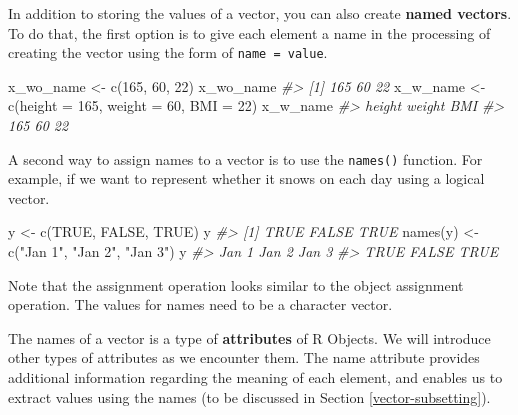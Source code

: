\documentclass[
]{book}
\newenvironment{Shaded}{\begin{snugshade}}{\end{snugshade}}
\newcommand{\AttributeTok}[1]{\textcolor[rgb]{0.77,0.63,0.00}{#1}}
\newcommand{\CommentTok}[1]{\textcolor[rgb]{0.56,0.35,0.01}{\textit{#1}}}
\newcommand{\ConstantTok}[1]{\textcolor[rgb]{0.00,0.00,0.00}{#1}}
\newcommand{\DecValTok}[1]{\textcolor[rgb]{0.00,0.00,0.81}{#1}}
\newcommand{\FunctionTok}[1]{\textcolor[rgb]{0.00,0.00,0.00}{#1}}
\newcommand{\NormalTok}[1]{#1}
\newcommand{\OtherTok}[1]{\textcolor[rgb]{0.56,0.35,0.01}{#1}}
\newcommand{\StringTok}[1]{\textcolor[rgb]{0.31,0.60,0.02}{#1}}
\begin{document}
In addition to storing the values of a vector, you can also create \textbf{named vectors}. To do that, the first option is to give each element a name in the processing of creating the vector using the form of \texttt{name\ =\ value}.

\begin{Shaded}
\begin{Highlighting}[]
\NormalTok{x\_wo\_name }\OtherTok{\textless{}{-}} \FunctionTok{c}\NormalTok{(}\DecValTok{165}\NormalTok{, }\DecValTok{60}\NormalTok{, }\DecValTok{22}\NormalTok{)}
\NormalTok{x\_wo\_name}
\CommentTok{\#\textgreater{} [1] 165  60  22}
\NormalTok{x\_w\_name }\OtherTok{\textless{}{-}} \FunctionTok{c}\NormalTok{(}\AttributeTok{height =} \DecValTok{165}\NormalTok{, }\AttributeTok{weight =} \DecValTok{60}\NormalTok{, }\AttributeTok{BMI =} \DecValTok{22}\NormalTok{)}
\NormalTok{x\_w\_name}
\CommentTok{\#\textgreater{} height weight    BMI }
\CommentTok{\#\textgreater{}    165     60     22}
\end{Highlighting}
\end{Shaded}

A second way to assign names to a vector is to use the \texttt{names()} function. For example, if we want to represent whether it snows on each day using a logical vector.

\begin{Shaded}
\begin{Highlighting}[]
\NormalTok{y }\OtherTok{\textless{}{-}} \FunctionTok{c}\NormalTok{(}\ConstantTok{TRUE}\NormalTok{, }\ConstantTok{FALSE}\NormalTok{, }\ConstantTok{TRUE}\NormalTok{)}
\NormalTok{y}
\CommentTok{\#\textgreater{} [1]  TRUE FALSE  TRUE}
\FunctionTok{names}\NormalTok{(y) }\OtherTok{\textless{}{-}} \FunctionTok{c}\NormalTok{(}\StringTok{"Jan 1"}\NormalTok{, }\StringTok{"Jan 2"}\NormalTok{, }\StringTok{"Jan 3"}\NormalTok{)}
\NormalTok{y}
\CommentTok{\#\textgreater{} Jan 1 Jan 2 Jan 3 }
\CommentTok{\#\textgreater{}  TRUE FALSE  TRUE}
\end{Highlighting}
\end{Shaded}

Note that the assignment operation looks similar to the object assignment operation. The values for names need to be a character vector.

The names of a vector is a type of \textbf{attributes} of R Objects. We will introduce other types of attributes as we encounter them. The name attribute provides additional information regarding the meaning of each element, and enables us to extract values using the names (to be discussed in Section \ref{vector-subsetting}).
\end{document}
